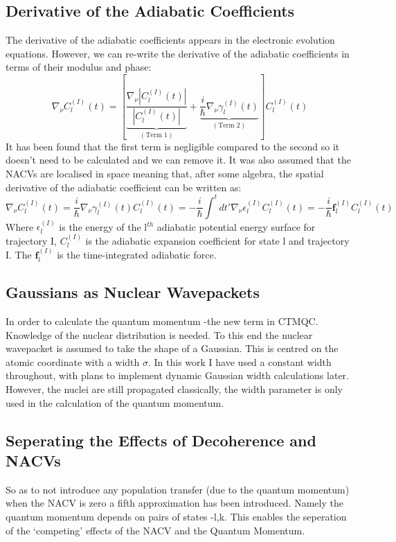 \subsection{Derivative of the Adiabatic Coefficients}
The derivative of the adiabatic coefficients appears in the electronic evolution equations. However, we can re-write the derivative of the adiabatic coefficients in terms of their modulus and phase:
\begin{equation}
  \nabla_{\nu} C_{l}^{(I)}(t) = \left[ \underbrace{\frac{\nabla_{\nu} |C_{l}^{(I)}(t)|}{|C_{l}^{(I)}(t)|}}_{(\text{Term 1})} + \underbrace{\frac{i}{\hbar} \nabla_{\nu} \gamma_{l}^{(I)}(t)}_{(\text{Term 2})}\right] C_{l}^{(I)}(t)
\end{equation}
It has been found that the first term is negligible compared to the second \cite{abedi_dynamical_2013, agostini_mixed_2013, agostini_exact_2015} so it doesn't need to be calculated and we can remove it. It was also assumed that the NACVs are localised in space meaning that, after some algebra, the spatial derivative of the adiabatic coefficient can be written as:
\begin{equation}
  \nabla_{\nu} C_{l}^{(I)}(t) = \frac{i}{\hbar} \nabla_{\nu} \gamma_{l}^{(I)}(t) C_{l}^{(I)}(t) = -\frac{i}{\hbar} \int^{t} dt' \nabla_{\nu} \epsilon_{l}^{(I)} C_{l}^{(I)}(t) = -\frac{i}{\hbar} \textbf{f}_{l}^{(I)} C_{l}^{(I)}(t)
  \label{eq:hist_force}
\end{equation}
Where $\epsilon_{l}^{(I)}$ is the energy of the l$^{th}$ adiabatic potential energy surface for trajectory I, $C_{l}^{(I)}$ is the adiabatic expansion coefficient for state l and trajectory I. The $\textbf{f}_{l}^{(I)}$ is the time-integrated adiabatic force.
\subsection{Gaussians as Nuclear Wavepackets}
In order to calculate the quantum momentum -the new term in CTMQC. Knowledge of the nuclear distribution is needed. To this end the nuclear wavepacket is assumed to take the shape of a Gaussian. This is centred on the atomic coordinate with a width $\sigma$. In this work I have used a constant width throughout, with plans to implement dynamic Gaussian width calculations later. However, the nuclei are still propagated classically, the width parameter is only used in the calculation of the quantum momentum.
\subsection{Seperating the Effects of Decoherence and NACVs}
So as to not introduce any population transfer (due to the quantum momentum) when the NACV is zero a fifth approximation has been introduced. Namely the quantum momentum depends on pairs of states -l,k. This enables the seperation of the `competing' effects of the NACV and the Quantum Momentum.
